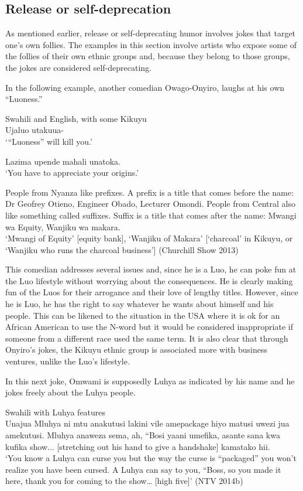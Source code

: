 \documentclass[output=paper]{langsci/langscibook}
\begin{document}
\subsection{Release or self-deprecation}

As mentioned earlier, release or self-deprecating humor involves jokes that target one’s own follies. The examples in this section involve artists who expose some of the follies of their own ethnic groups and, because they belong to those groups, the jokes are considered self-deprecating. 

In the following example, another comedian Owago-Onyiro, laughs at his own “Luoness.”

\ea\label{ex:muaka:10}
{Swahili and English, with some Kikuyu}\\
   Ujaluo utakuua-\\
\glt ‘“Luoness” will kill you.’
\z

\ea
 Lazima upende mahali unatoka.\\
\glt ‘You have to appreciate your origins.’ 
\z

\ea
 People from Nyanza like prefixes. A prefix is a title that comes before the name: Dr Geofrey Otieno, Engineer Obado, Lecturer Omondi. People from Central also like something called suffixes. Suffix is a title that comes after the name: Mwangi wa Equity, Wanjiku wa makara.\\
\glt ‘Mwangi of Equity’ [equity bank], ‘Wanjiku of Makara’ [‘charcoal’ in Kikuyu, or ‘Wanjiku who runs the charcoal business’] ({Churchill Show 2013})
\z

This comedian addresses several issues and, since he is a Luo, he can poke fun at the Luo lifestyle without worrying about the consequences. He is clearly making fun of the Luos for their arrogance and their love of lengthy titles. However, since he is Luo, he has the right to say whatever he wants about himself and his people. This can be likened to the situation in the USA where it is ok for an African American to use the N-word but it would be considered inappropriate if someone from a different race used the same term. It is also clear that through Onyiro’s jokes, the Kikuyu ethnic group is associated more with business ventures, unlike the Luo’s lifestyle. 

In this next joke, Omwami is supposedly Luhya as indicated by his name and he jokes freely about the Luhya people.

\ea
{Swahili with Luhya features}\\
 Unajua Mluhya ni mtu anakutusi lakini vile amepackage hiyo matusi uwezi jua amekutusi. Mluhya anaweza sema, ah, “Bosi yaani umefika, asante sana kwa kufika show... \textup{[stretching out his hand to give a handshake]} kamatako hii.\\
‘You know a Luhya can curse you but the way the curse is “packaged” you won’t realize you have been cursed. A Luhya can say to you, “Boss, so you made it here, thank you for coming to the show… [high five]’ (NTV 2014b)
\z
\end{document}
